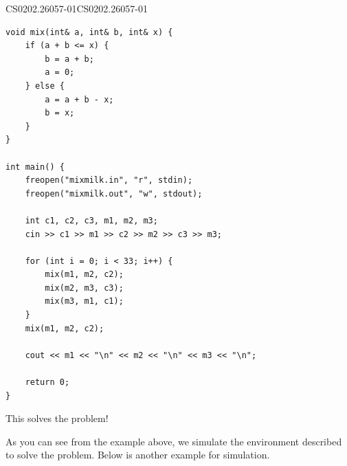 \documentclass[../../main.tex]{subfiles}
\begin{document}
\begin{solution}
\begin{cppboxSolution}{CS0202.26057-01}{CS0202.26057-01}
\begin{lstlisting}[style=cppstyle]
void mix(int& a, int& b, int& x) {
    if (a + b <= x) {
        b = a + b;
        a = 0;
    } else {
        a = a + b - x;
        b = x;
    }
}

int main() {
    freopen("mixmilk.in", "r", stdin);
    freopen("mixmilk.out", "w", stdout);

    int c1, c2, c3, m1, m2, m3;
    cin >> c1 >> m1 >> c2 >> m2 >> c3 >> m3;

    for (int i = 0; i < 33; i++) {
        mix(m1, m2, c2);
        mix(m2, m3, c3);
        mix(m3, m1, c1);
    }
    mix(m1, m2, c2);

    cout << m1 << "\n" << m2 << "\n" << m3 << "\n";

    return 0;
}
\end{lstlisting}
\end{cppboxSolution}

This solves the problem!
\end{solution}

As you can see from the example above, we simulate the environment
described to solve the problem. Below is another example for
simulation.
\end{document}
